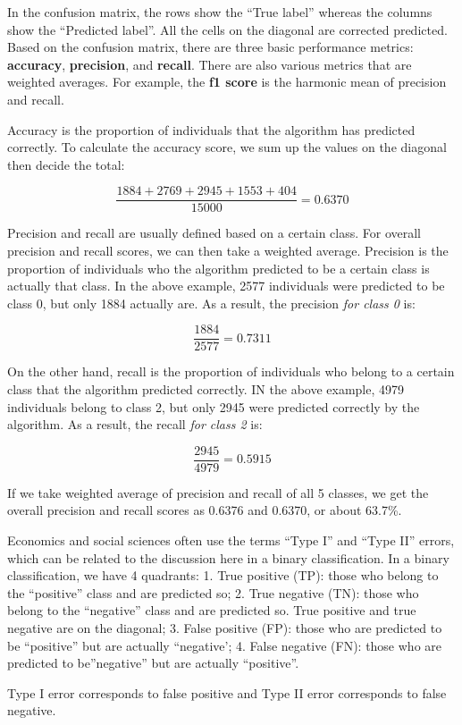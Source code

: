 \documentclass[
]{book}
\theoremstyle{definition}
\theoremstyle{definition}
\theoremstyle{definition}
\theoremstyle{definition}
\theoremstyle{remark}
\begin{document}
In the confusion matrix, the rows show the ``True label'' whereas the columns show the ``Predicted label''. All the cells on the diagonal are corrected predicted. Based on the confusion matrix, there are three basic performance metrics: \textbf{accuracy}, \textbf{precision}, and \textbf{recall}. There are also various metrics that are weighted averages. For example, the \textbf{f1 score} is the harmonic mean of precision and recall.

Accuracy is the proportion of individuals that the algorithm has predicted correctly. To calculate the accuracy score, we sum up the values on the diagonal then decide the total:

\[\frac{1884+2769+2945+1553+404}{15000}=0.6370\]

Precision and recall are usually defined based on a certain class. For overall precision and recall scores, we can then take a weighted average. Precision is the proportion of individuals who the algorithm predicted to be a certain class is actually that class. In the above example, 2577 individuals were predicted to be class 0, but only 1884 actually are. As a result, the precision \emph{for class 0} is:

\[\frac{1884}{2577}=0.7311\]

On the other hand, recall is the proportion of individuals who belong to a certain class that the algorithm predicted correctly. IN the above example, 4979 individuals belong to class 2, but only 2945 were predicted correctly by the algorithm. As a result, the recall \emph{for class 2} is:

\[\frac{2945}{4979}=0.5915\]

If we take weighted average of precision and recall of all 5 classes, we get the overall precision and recall scores as 0.6376 and 0.6370, or about 63.7\%.

Economics and social sciences often use the terms ``Type I'' and ``Type II'' errors, which can be related to the discussion here in a binary classification. In a binary classification, we have 4 quadrants:
1. True positive (TP): those who belong to the ``positive'' class and are predicted so;
2. True negative (TN): those who belong to the ``negative'' class and are predicted so. True positive and true negative are on the diagonal;
3. False positive (FP): those who are predicted to be ``positive'' but are actually ``negative';
4. False negative (FN): those who are predicted to be''negative'' but are actually ``positive''.

Type I error corresponds to false positive and Type II error corresponds to false negative.
\end{document}
